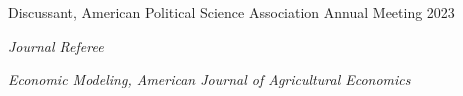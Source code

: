 \documentclass[10pt]{article}
\newcommand{\halfblankline}{\quad\vspace{-0.5\baselineskip}\pagebreak[3]}
\begin{document}
Discussant, American Political Science Association Annual Meeting \hfill 2023

\halfblankline


\textit{Journal Referee}

\textit{Economic Modeling, American Journal of Agricultural Economics} 

\halfblankline














\end{document}
